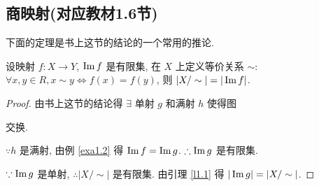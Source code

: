 \documentclass[color=black,device=normal,lang=cn,mode=geye]{elegantnote}
\begin{document}
\subsection{商映射(对应教材1.6节)}
下面的定理是书上这节的结论的一个常用的推论.
\begin{corollary}
    设映射 $f:X\to Y$, $\operatorname{Im} f$ 是有限集, 在 $X$ 上定义等价关系 $\sim$: $\forall x,y\in R,x\sim y\Leftrightarrow f(x)=f(y)$, 则 $|X/\sim|=|\operatorname{Im} f|$.
\end{corollary}
\begin{proof}
    由书上这节的结论得 $\exists$ 单射 $g$ 和满射 $h$ 使得图
    \begin{center}
    \end{center}
    交换.
    
    $\because h$ 是满射, 由例 \ref{exa1.2} 得 $\operatorname{Im} f=\operatorname{Im} g$. $\therefore\operatorname{Im} g$ 是有限集.

    $\because\operatorname{Im} g$ 是单射, $\therefore|X/\sim|$ 是有限集. 由引理 \ref{l1.1} 得 $|\operatorname{Im} g|=|X/\sim|$.
\end{proof}
\end{document}
